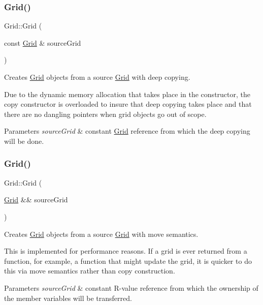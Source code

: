 \subsubsection{\texorpdfstring{Grid()}{Grid()}\hspace{0.1cm}{\footnotesize\ttfamily [3/4]}}
{\footnotesize\ttfamily Grid\+::\+Grid (\begin{DoxyParamCaption}\item[{const \hyperlink{class_grid}{Grid} \&}]{source\+Grid }\end{DoxyParamCaption})}



Creates \hyperlink{class_grid}{Grid} objects from a source \hyperlink{class_grid}{Grid} with deep copying. 

Due to the dynamic memory allocation that takes place in the constructor, the copy constructor is overloaded to insure that deep copying takes place and that there are no dangling pointers when grid objects go out of scope.


\begin{DoxyParams}{Parameters}
{\em source\+Grid} & constant \hyperlink{class_grid}{Grid} reference from which the deep copying will be done. \\
\hline
\end{DoxyParams}
\mbox{\label{class_grid_a3828d0bf34f6c97ed93adc84d4ce6c4b}} 
\subsubsection{\texorpdfstring{Grid()}{Grid()}\hspace{0.1cm}{\footnotesize\ttfamily [4/4]}}
{\footnotesize\ttfamily Grid\+::\+Grid (\begin{DoxyParamCaption}\item[{\hyperlink{class_grid}{Grid} \&\&}]{source\+Grid }\end{DoxyParamCaption})}



Creates \hyperlink{class_grid}{Grid} objects from a source \hyperlink{class_grid}{Grid} with move semantics. 

This is implemented for performance reasons. If a grid is ever returned from a function, for example, a function that might update the grid, it is quicker to do this via move semantics rather than copy construction.


\begin{DoxyParams}{Parameters}
{\em source\+Grid} & constant R-\/value reference from which the ownership of the member variables will be transferred. \\
\hline
\end{DoxyParams}
\mbox{\label{class_grid_a3661d0a7f998caaaf8627d7a67072116}} 
